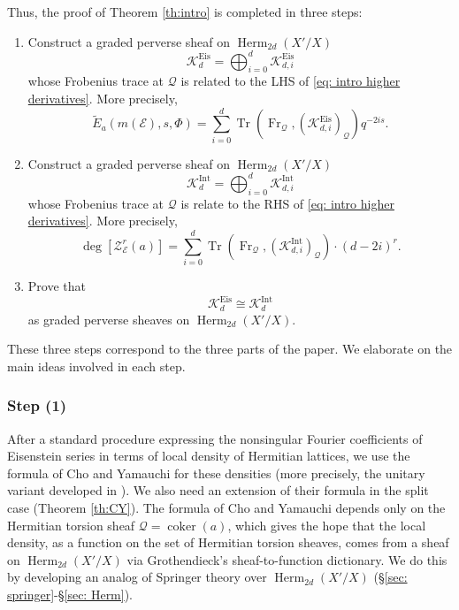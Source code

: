 \documentclass[reqno]{amsart}
\numberwithin{equation}{section}
\newcommand{\wt}[1]{\widetilde{#1}}
\DeclareMathOperator{\Frob}{Fr}
\DeclareMathOperator{\coker}{coker}
\DeclareMathOperator{\Tr}{Tr}
\DeclareMathOperator{\Eis}{Eis}
\DeclareMathOperator{\Herm}{Herm}
\DeclareMathOperator{\Int}{Int}
\newcommand\cE{\mathcal{E}}
\newcommand\cK{\mathcal{K}}
\newcommand\cQ{\mathcal{Q}}
\newcommand\cZ{\mathcal{Z}}
\theoremstyle{remark}
\numberwithin{equation}{section}
\begin{document}
Thus, the proof of Theorem \ref{th:intro} is completed in three steps:
\begin{enumerate}
\item Construct a graded perverse sheaf on $\Herm_{2d}(X'/X)$
\begin{equation*}
\cK^{\Eis}_{d}=\bigoplus_{i=0}^{d}\cK^{\Eis}_{d,i}
\end{equation*}
whose Frobenius trace at $\cQ$ is related to the LHS of \eqref{eq: intro higher derivatives}. More precisely, 
\begin{equation}\label{intro KEis}
\wt{E}_{a}(m(\cE),s, \Phi)= \sum_{i=0}^{d}\Tr(\Frob_{\cQ}, (\cK^{\Eis}_{d,i})_{\cQ})q^{-2is}.
\end{equation}
\item Construct a graded perverse sheaf on $\Herm_{2d}(X'/X)$
\begin{equation*}
\cK^{\Int}_{d}=\bigoplus_{i=0}^{d}\cK^{\Int}_{d,i}
\end{equation*}
whose Frobenius trace at $\cQ$ is relate to the RHS of \eqref{eq: intro higher derivatives}. More precisely,
\begin{equation}\label{intro KInt}
\deg [\cZ_{\cE}^r(a)]=\sum_{i=0}^{d}\Tr(\Frob_{\cQ}, (\cK^{\Int}_{d,i})_{\cQ})\cdot (d-2i)^{r}.
\end{equation}
\item Prove that 
\begin{equation}\label{KK}
\cK^{\Eis}_{d}\cong \cK^{\Int}_{d}
\end{equation}
as graded perverse sheaves on $\Herm_{2d}(X'/X)$.
\end{enumerate}

These three steps correspond to the three parts of the paper. We elaborate on the main ideas involved in each step. 

\subsubsection{Step (1)} After a standard procedure expressing the nonsingular Fourier coefficients of Eisenstein series in terms of local density of Hermitian lattices, we use the formula of Cho and Yamauchi \cite{CY} for these densities (more precisely, the unitary variant developed in \cite{LZ1}). We also need an extension of their formula in the split case (Theorem \ref{th:CY}). The formula of Cho and Yamauchi depends only on the Hermitian torsion sheaf $\cQ=\coker(a)$, which gives the hope that the local density, as a function on the set of Hermitian torsion sheaves, comes from a sheaf on $\Herm_{2d}(X'/X)$ via Grothendieck's sheaf-to-function dictionary. We do this by developing an analog of Springer theory over  $\Herm_{2d}(X'/X)$ (\S\ref{sec: springer}-\S\ref{sec: Herm}).
\end{document}
